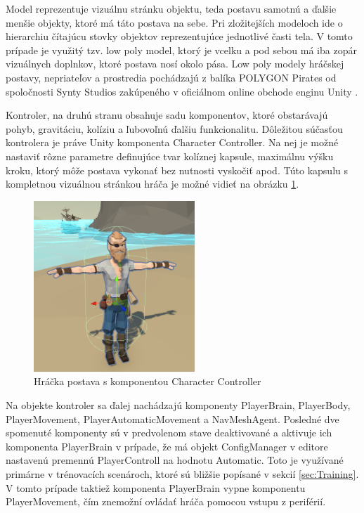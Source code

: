 \documentclass[slovak, master]{diploma}
\begin{document}
Model reprezentuje vizuálnu stránku objektu, teda postavu samotnú a ďalšie menšie objekty, ktoré má táto postava na sebe. Pri zložitejších modeloch ide o hierarchiu čítajúcu stovky objektov reprezentujúce jednotlivé časti tela. V tomto prípade je využitý tzv. low poly model, ktorý je vcelku a pod sebou má iba zopár vizuálnych doplnkov, ktoré postava nosí okolo pása. Low poly modely hráčskej postavy, nepriateľov a prostredia pochádzajú z balíka POLYGON Pirates od spoločnosti Synty Studios zakúpeného v oficiálnom online obchode enginu Unity \cite{Synty}.

Kontroler, na druhú stranu obsahuje sadu komponentov, ktoré obstarávajú pohyb, gravitáciu, kolíziu a ľubovoľnú ďalšiu funkcionalitu. Dôležitou súčasťou kontrolera je práve Unity komponenta Character Controller. Na nej je možné nastaviť rôzne parametre definujúce tvar kolíznej kapsule, maximálnu výšku kroku, ktorý môže postava vykonať bez nutnosti vyskočiť apod. Túto kapsulu s kompletnou vizuálnou stránkou hráča je možné vidieť na obrázku \ref{pic:PlayerController}.

\begin{figure}[!htbp]
	\centering
	\includegraphics[width=0.54\textwidth]{Figures/controller.png}
	\caption{Hráčka postava s komponentou Character Controller}
	\label{pic:PlayerController}
\end{figure}

Na objekte kontroler sa ďalej nachádzajú komponenty PlayerBrain, PlayerBody, PlayerMovement, PlayerAutomaticMovement a NavMeshAgent. Posledné dve spomenuté komponenty sú v predvolenom stave deaktivované a aktivuje ich komponenta PlayerBrain v prípade, že má objekt ConfigManager v editore nastavenú premennú PlayerControll na hodnotu Automatic. Toto je využívané primárne v trénovacích scenároch, ktoré sú bližšie popísané v sekcií \ref{sec:Training}. V tomto prípade taktiež komponenta PlayerBrain vypne komponentu PlayerMovement, čím znemožní ovládať hráča pomocou vstupu z periférií. 
\end{document}
